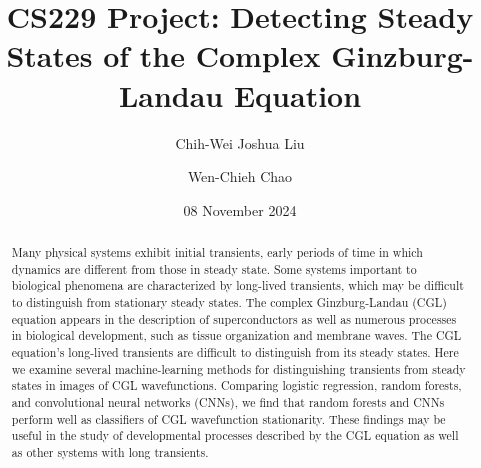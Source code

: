 \documentclass[nofootinbib,pre,superscriptaddress,twocolumn,longbibliography,floatfix]{revtex4-2}
\begin{document}
\title{CS229 Project: Detecting Steady States of the Complex Ginzburg-Landau Equation}

\author{Chih-Wei Joshua Liu}

\author{Wen-Chieh Chao}

\date{08 November 2024}

\begin{abstract}
    Many physical systems exhibit initial transients, early periods of time in which dynamics are different from those in steady state.
    Some systems important to biological phenomena are characterized by long-lived transients, which may be difficult to distinguish from stationary steady states.
    The complex Ginzburg-Landau (CGL) equation appears in the description of superconductors as well as numerous processes in biological development,
    such as tissue organization and membrane waves.
    The CGL equation's long-lived transients are difficult to distinguish from its steady states.
    Here we examine several machine-learning methods for distinguishing transients from steady states in images of CGL wavefunctions.
    Comparing logistic regression, random forests, and convolutional neural networks (CNNs),
    we find that random forests and CNNs perform well as classifiers of CGL wavefunction stationarity. 
    These findings may be useful in the study of developmental processes described by the CGL equation as well as other systems with long transients.
\end{abstract}

\maketitle
\end{document}
